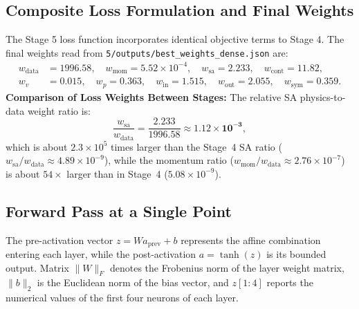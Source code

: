 \documentclass[11pt,a4paper]{article}
\begin{document}
\subsection{Composite Loss Formulation and Final Weights}
The Stage 5 loss function incorporates identical objective terms to Stage 4. The final weights read from \texttt{5/outputs/best\_weights\_dense.json} are:
\begin{align}
w_{\mathrm{data}} &= 1996.58, \quad w_{\mathrm{mom}} = 5.52\times 10^{-4}, \quad w_{\mathrm{sa}} = \mathbf{2.233}, \quad w_{\mathrm{cont}} = 11.82, \\
w_{v} &= 0.015, \quad w_{p} = 0.363, \quad w_{\mathrm{in}} = 1.515, \quad w_{\mathrm{out}} = 2.055, \quad w_{\mathrm{sym}} = 0.359.
\end{align}
\noindent\textbf{Comparison of Loss Weights Between Stages:} The relative SA physics-to-data weight ratio is:
\begin{equation}
\frac{w_{\mathrm{sa}}}{w_{\mathrm{data}}} = \frac{2.233}{1996.58} \approx \mathbf{1.12\times 10^{-3}},
\end{equation}
which is about $2.3\times 10^5$ times larger than the Stage~4 SA ratio ($w_{\mathrm{sa}}/w_{\mathrm{data}} \approx 4.89\times 10^{-9}$), while the momentum ratio ($w_{\mathrm{mom}}/w_{\mathrm{data}} \approx 2.76\times 10^{-7}$) is about $54\times$ larger than in Stage~4 ($5.08\times 10^{-9}$).

\subsection{Forward Pass at a Single Point}
The pre-activation vector $z = W a_{\mathrm{prev}} + b$ represents the affine combination entering each layer, while the post-activation $a = \tanh(z)$ is its bounded output. Matrix $\|W\|_F$ denotes the Frobenius norm of the layer weight matrix, $\|b\|_2$ is the Euclidean norm of the bias vector, and $z[1:4]$ reports the numerical values of the first four neurons of each layer.
\end{document}
